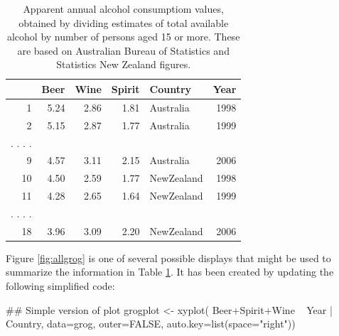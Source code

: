 \documentclass{tufte-book}\usepackage[]{graphicx}\usepackage[]{color}
\begin{document}
\begin{table}
\begin{center}
\caption{Apparent annual alcohol consumptiom values, obtained by dividing
    estimates of total available alcohol by number of persons aged 15
    or more. These are based on Australian Bureau of Statistics
    and Statistics New Zealand figures.\label{tab:grog}}
\begin{tabular}{rrrrlr}
  \hline
 & Beer & Wine & Spirit & Country & Year \\
  \hline
1 & 5.24 & 2.86 & 1.81 & Australia & 1998 \\
  2 & 5.15 & 2.87 & 1.77 & Australia & 1999 \\
. . . .\\
  9 & 4.57 & 3.11 & 2.15 & Australia & 2006 \\
  10 & 4.50 & 2.59 & 1.77 & NewZealand & 1998 \\
  11 & 4.28 & 2.65 & 1.64 & NewZealand & 1999 \\
. . . .\\
  18 & 3.96 & 3.09 & 2.20 & NewZealand & 2006 \\
   \hline
\end{tabular}
\end{center}
\end{table}

Figure \ref{fig:allgrog} is one of several possible displays that
might be used to summarize the information in Table \ref{tab:grog}.
It has been created by updating the following simplified code:
\noindent
\begin{Schunk}
\begin{Sinput}
## Simple version of plot
grogplot <- xyplot(
              Beer+Spirit+Wine ~ Year | Country,
              data=grog, outer=FALSE,
              auto.key=list(space="right"))
\end{Sinput}
\end{Schunk}
\end{document}
